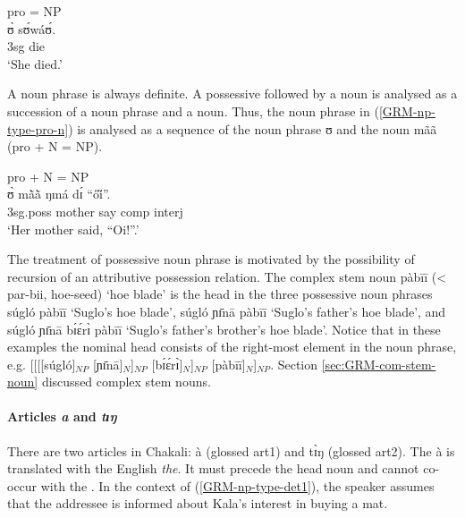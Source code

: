 \begin{exe}
\begin{exe}
\begin{exe}
\begin{exe}
 \ex\label{GRM-np-type-pro}{\rm pro = NP}\\
\gll  ʊ̀  sʊ́wáʊ́.\\
   {\sc 3sg} die\\
\glt  `She died.'
\z


A  noun phrase is always definite. A possessive  followed by a
noun is analysed as a succession of a noun phrase and a noun. Thus,  the noun
phrase in (\ref{GRM-np-type-pro-n})  is analysed as a sequence of the noun
phrase {\sls ʊ} and the  noun  {\sls mãã} (pro + N = NP). 


\begin{exe}

 \ex\label{GRM-np-type-pro-n}{\rm pro + N = NP}\\
\gll   ʊ̀ mã̀ã̀ ŋmá dɪ́ ``ői̋''.\\
   {\sc 3sg.poss} mother say  {\sc comp} {\sc interj}\\
\glt  `Her mother said, ``Oi!''.'
\z


The treatment  of possessive noun phrase is   motivated  by the possibility of  recursion of  an 
attributive possession relation.  The complex stem noun {\sls pàbīī} (< {\sls par-bii},  
hoe-seed)  `hoe blade' is the head in the three possessive noun phrases  {\sls súgló pàbīī} 
`Suglo's hoe blade',    {\sls súgló ɲɪ̄nā pàbīī} `Suglo's father's hoe blade', and {\sls 
súgló ɲɪ̄nā bɪ́ɛ́rɪ̀ pàbīī}  `Suglo's father's brother's hoe blade'.  Notice that in these 
examples the nominal head consists of the right-most element in the noun phrase, e.g.  
[[[[súgló]$_{NP}$ [ɲɪ̄nā]$_{N}$]$_{NP}$ [bɪ́ɛ́rɪ̀]$_{N}$]$_{NP}$ [pàbīī]$_{N}$]$_{NP}$. 
Section \ref{sec:GRM-com-stem-noun} discussed complex stem nouns. 




\paragraph{Articles {\it a} and  {\it  tɪŋ}}
\label{sec:GRM-np-def-articles}

There are two articles  in Chakali:   {\sls à} (glossed {\sc art1}) and {\sls tɪ̀ŋ}  (glossed {\sc art2}).  The   {\sls à} is translated with the English  {\it the}.  It must precede the head noun and cannot co-occur with the  .  In the context of (\ref{GRM-np-type-det1}), the speaker assumes that the addressee is informed about Kala's interest in buying a mat. 



\end{exe}
\end{exe}
\end{exe}
\end{exe}
\end{exe}
